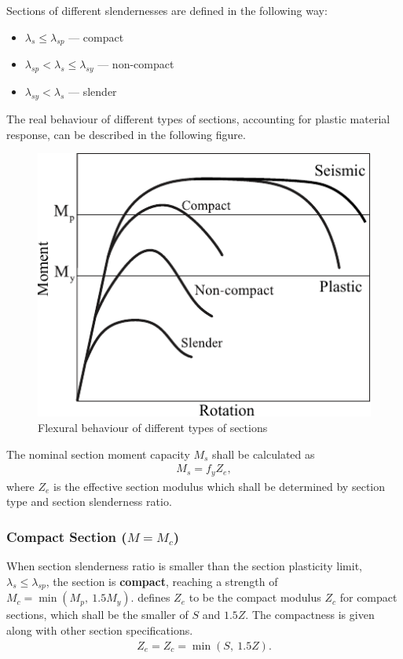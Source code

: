Sections of different slendernesses are defined in the following way:
\begin{itemize}
\item $\lambda_s\leqslant\lambda_{sp}$ --- compact
\item $\lambda_{sp}<\lambda_s\leqslant\lambda_{sy}$ --- non-compact
\item $\lambda_{sy}<\lambda_s$ --- slender
\end{itemize}
The real behaviour of different types of sections, accounting for plastic material response, can be described in the following figure.
\begin{figure}[H]
\centering
\includegraphics{PIC/CH05/SECC}\caption{Flexural behaviour of different types of sections}
\end{figure}

The nominal section moment capacity $M_s$ shall be calculated as
\begin{gather}
M_s=f_yZ_e,
\end{gather}
where $Z_e$ is the effective section modulus which shall be determined by section type and section slenderness ratio.
\subsubsection{Compact Section ($M=M_c$)}
When section slenderness ratio is smaller than the section plasticity limit, $\lambda_s\leqslant\lambda_{sp}$, the section is \textbf{compact}, reaching a strength of $M_c=\min\left(M_p,~1.5M_y\right)$.  defines $Z_e$ to be the compact modulus $Z_c$ for compact sections, which shall be the smaller of $S$ and $1.5Z$. The compactness is given along with other section specifications.
\begin{gather}\label{eq:compact_modulus}
Z_e=Z_c=\min\left(S,~1.5Z\right).
\end{gather}

